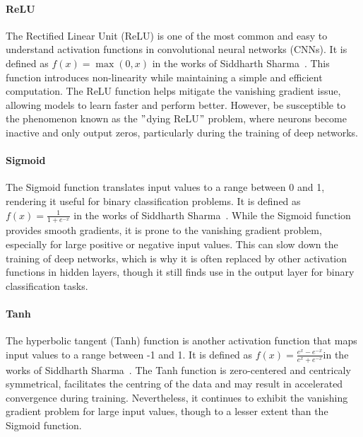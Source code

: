 \paragraph{ReLU}\label{par:relu}
The Rectified Linear Unit (ReLU) is one of the most common and easy to understand activation functions in convolutional neural networks (CNNs).
It is defined as \( f(x) = \max(0, x) \) in the works of Siddharth Sharma~\cite{sharma2017activation}.
This function introduces non-linearity while maintaining a simple and efficient computation.
The ReLU function helps mitigate the vanishing gradient issue, allowing models to learn faster and perform better.
However, be susceptible to the phenomenon known as the \("\)dying ReLU\("\) problem, where neurons become inactive and only output zeros,
particularly during the training of deep networks.



\paragraph{Sigmoid}\label{par:sigmoid}
The Sigmoid function translates input values to a range between 0 and 1,
rendering it useful for binary classification problems.
It is defined as \( f(x) = \frac{1}{1 + e^{-x}} \) in the works of Siddharth Sharma~\cite{sharma2017activation}.
While the Sigmoid function provides smooth gradients,
it is prone to the vanishing gradient problem,
especially for large positive or negative input values.
This can slow down the training of deep networks,
which is why it is often replaced by other activation
functions in hidden layers,
though it still finds use in the output layer for binary classification tasks.



\paragraph{Tanh}\label{par:tanh}
The hyperbolic tangent (Tanh) function is another activation function that maps input values to a range between -1 and 1.
It is defined as  \( f(x) = \frac{e^x - e^{-x}}{e^x + e^{-x}} \)in the works of Siddharth Sharma~\cite{sharma2017activation}.
The Tanh function is zero-centered and centricaly symmetrical, facilitates the centring of the data and may result in accelerated convergence during training.
Nevertheless, it continues to exhibit the vanishing gradient problem for large input values, though to a lesser extent than the Sigmoid function.




